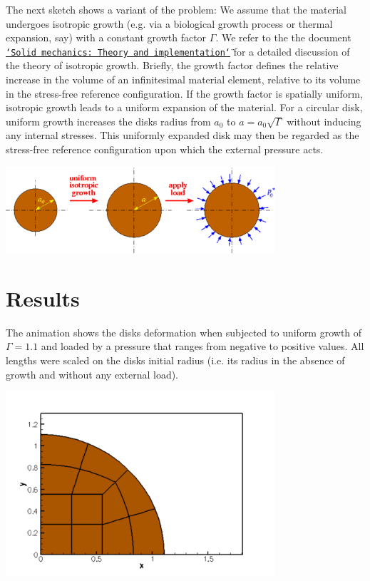 The next sketch shows a variant of the problem\+: We assume that the material undergoes isotropic growth (e.\+g. via a biological growth process or thermal expansion, say) with a constant growth factor $ \Gamma $. We refer to the the document \href{../../solid_theory/html/index.html#isotropic_growth}{\tt \char`\"{}\+Solid mechanics\+: Theory and implementation\char`\"{}} for a detailed discussion of the theory of isotropic growth. Briefly, the growth factor defines the relative increase in the volume of an infinitesimal material element, relative to its volume in the stress-\/free reference configuration. If the growth factor is spatially uniform, isotropic growth leads to a uniform expansion of the material. For a circular disk, uniform growth increases the disk\textquotesingle{}s radius from $ a_0 $ to $ a = a_0 \sqrt{\Gamma} $ without inducing any internal stresses. This uniformly expanded disk may then be regarded as the stress-\/free reference configuration upon which the external pressure acts.

 
\begin{DoxyImage}
\includegraphics[width=0.75\textwidth]{disk_compression_with_growth}
\end{DoxyImage}




 

\hypertarget{index_results}{}\section{Results}\label{index_results}
The animation shows the disk\textquotesingle{}s deformation when subjected to uniform growth of $ \Gamma = 1.1 $ and loaded by a pressure that ranges from negative to positive values. All lengths were scaled on the disks initial radius (i.\+e. its radius in the absence of growth and without any external load).

 
\begin{DoxyImage}
\includegraphics[width=0.75\textwidth]{disk_compression_anim}
\end{DoxyImage}


